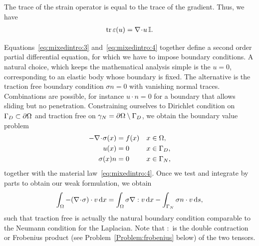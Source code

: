 \begin{remark}
  The trace of the strain operator is equal to the trace of the
  gradient. Thus, we have
  \begin{gather}
    \label{eq:mixedintro:5}
    \operatorname{tr} \varepsilon(u) = \nabla\!\cdot\! u \,\mathbb I.
  \end{gather}
\end{remark}

\begin{intro}
  Equations~\eqref{eq:mixedintro:3} and~\eqref{eq:mixedintro:4}
  together define a second order partial differential equation, for
  which we have to impose boundary conditions. A natural choice, which
  keeps the mathematical analysis simple is the  $u=0$, corresponding to an elastic body whose
  boundary is fixed. The alternative is the traction free boundary
  condition $\sigma n=0$ with vanishing normal traces. Combinations
  are possible, for instance $u\cdot n=0$ for a boundary that allows
  sliding but no penetration. Constraining ourselves to Dirichlet
  condition on $\Gamma_D\subset \partial\Omega$ and traction free on
  $\gamma_N = \partial\Omega\setminus\Gamma_D$, we obtain the
  boundary value problem
  \begin{gather}
    \label{eq:mixedintro:lame-navier-bvp}
    \begin{aligned}
      -\nabla\!\cdot\! \sigma(x) &= f(x) & x&\in\Omega,\\
      u(x) &= 0 & x&\in\Gamma_D, \\
      \sigma(x)n &=0& x&\in\Gamma_N,
    \end{aligned}
  \end{gather}
  together with the material law~\eqref{eq:mixedintro:4}.  Once we
  test and integrate by parts to obtain our weak formulation, we
  obtain
  \begin{gather*}
    \int_{\Omega} -(\nabla\!\cdot\! \sigma) \cdot v\,\mathrm{d} x
    = \int_{\Omega} \sigma\nabla: v\,\mathrm{d} x
    - \int_{\Gamma_N} \sigma n\cdot v\,\mathrm{d} s,
  \end{gather*}
  such that traction free is actually the natural boundary condition
  comparable to the Neumann condition for the Laplacian. Note that $:$
  is the double contraction or Frobenius product (see
  Problem~\ref{Problem:frobenius} below) of the two tensors.
\end{intro}

